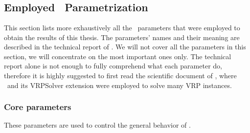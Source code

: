 \chapter{\bapcod}
\label{sec:bapcod-appendix}


%
%
%


\section{Employed \bapcod\ Parametrization}
\label{sec:employed-bapcod-parametrization}

This section lists more exhaustively all the \bapcod\ parameters
that were employed to obtain the results of this thesis.
The parameters' names and their meaning are described in the technical report of \textcite{sadykov2021}.
We will not cover all the parameters in this section,
we will concentrate on the most important ones only.
The technical report alone is not enough to fully comprehend what each parameter do,
therefore it is highly suggested to first read the scientific document of \textcite{pessoa2020a},
where \bapcod\ and its VRPSolver extension were employed to solve many VRP instances.

\subsection{Core parameters}

These parameters are used to control the general behavior of \bapcod.

